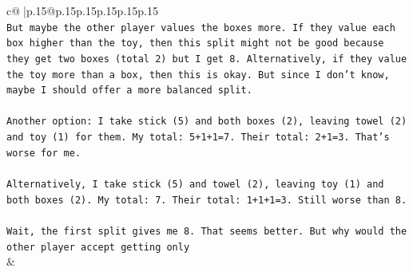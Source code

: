 \documentclass{article}
\begin{document}
{\begin{supertabular}{c@{$\;$}|p{.15\linewidth}@{}p{.15\linewidth}p{.15\linewidth}p{.15\linewidth}p{.15\linewidth}p{.15\linewidth}}
{{{\\ 
\texttt{But maybe the other player values the boxes more. If they value each box higher than the toy, then this split might not be good because they get two boxes (total 2) but I get 8. Alternatively, if they value the toy more than a box, then this is okay. But since I don't know, maybe I should offer a more balanced split.} \\
\\ 
\texttt{Another option: I take stick (5) and both boxes (2), leaving towel (2) and toy (1) for them. My total: 5+1+1=7. Their total: 2+1=3. That's worse for me.} \\
\\ 
\texttt{Alternatively, I take stick (5) and towel (2), leaving toy (1) and both boxes (2). My total: 7. Their total: 1+1+1=3. Still worse than 8.} \\
\\ 
\texttt{Wait, the first split gives me 8. That seems better. But why would the other player accept getting only} \\
            }
        }
    }
    & \\ \\


\end{supertabular}}
\end{document}
